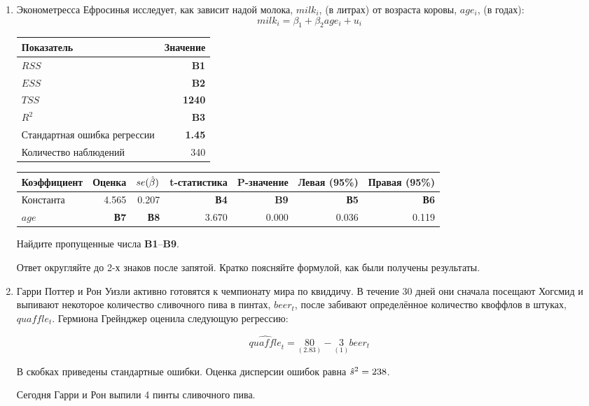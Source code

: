 \documentclass[12pt, a4paper]{article}\usepackage[]{graphicx}\usepackage[]{color}
\begin{document}
\begin{enumerate}


\item Эконометресса Ефросинья исследует, как зависит надой молока, $milk_i$, (в литрах) от возраста коровы, $age_i$, (в годах):
\[
milk_i = \beta_1 + \beta_2 age_i + u_i
\]

\begin{tabular}{lr} \toprule
Показатель & Значение \\
\midrule
$RSS$                        & \textbf{B1} \\
$ESS$                        & \textbf{B2} \\
$TSS$                        & \textbf{1240} \\
$R^2$                        & \textbf{B3} \\
Стандартная ошибка регрессии & \textbf{1.45} \\
Количество наблюдений        & 340 \\
\bottomrule
\end{tabular}

\begin{tabular}{lrrrrrr} \toprule
Коэффициент & Оценка & $se(\hat{\beta})$ & t-статистика & P-значение & Левая (95\%) & Правая (95\%) \\
\midrule
Константа & 4.565 & 0.207 & \textbf{В4} & \textbf{B9} & \textbf{В5} & \textbf{В6} \\
$age$ & \textbf{В7} & \textbf{В8} & 3.670 & 0.000 & 0.036 & 0.119 \\
\bottomrule
\end{tabular}

Найдите пропущенные числа \textbf{B1}--\textbf{B9}.

Ответ округляйте до 2-х знаков после запятой. Кратко поясняйте формулой, как были получены результаты.



\item Гарри Поттер и Рон Уизли активно готовятся к чемпионату мира по квиддичу. В течение 30 дней они сначала посещают Хогсмид и выпивают некоторое количество сливочного пива в пинтах, $beer_t$, после забивают определённое количество квоффлов в штуках, $quaffle_t$. Гермиона Грейнджер оценила следующую регрессию:

\[
\widehat{quaffle}_t = \underset{(2.83)}{80} - \underset{(1)}{3} beer_t
\]

В скобках приведены стандартные ошибки. Оценка дисперсии ошибок равна $\hat{s}^2 = 238$.

Сегодня Гарри и Рон выпили 4 пинты сливочного пива.


\end{enumerate}
\end{document}
